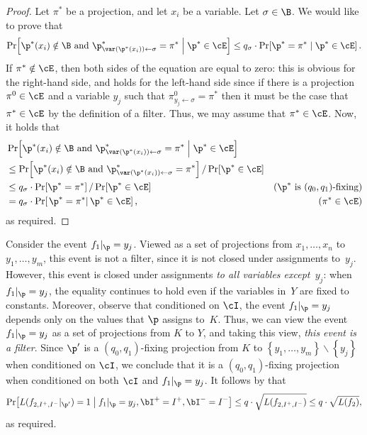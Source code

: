 \begin{proof}
Let $\pi^{*}$ be a projection, and let $x_{i}$ be a variable. Let
$\sigma\in\B$. We would like to prove that 
\[
\Pr\!\left[\p^{*}(x_{i})\notin\B\text{ and }\p_{\var(\p^{*}(x_{i}))\gets\sigma}^{*}=\pi^{*}\;\middle|\;\p^{*}\in\cE\right]\le q_{\sigma}\cdot\Pr\!\left[\p^{*}=\pi^{*}\mid\p^{*}\in\cE\right].
\]
If $\pi^{*}\notin\cE$, then both sides of the equation are equal
to zero: this is obvious for the right-hand side, and holds for the
left-hand side since if there is a projection~$\pi^{0}\in\cE$ and
a variable $y_{j}$ such that $\pi_{y_{j}\gets\sigma}^{0}=\pi^{*}$
then it must be the case that $\pi^{*}\in\cE$ by the definition of
a filter. Thus, we may assume that $\pi^{*}\in\cE$. Now, it holds
that 
\begin{align*}
 & \Pr\!\left[\p^{*}(x_{i})\notin\B\text{ and }\p_{\var(\p^{*}(x_{i}))\gets\sigma}^{*}=\pi^{*}\;\middle|\;\p^{*}\in\cE\right]\\
 & \le\Pr\!\left[\p^{*}(x_{i})\notin\B\text{ and }\p_{\var(\p^{*}(x_{i}))\gets\sigma}^{*}=\pi^{*}\right]/\Pr\!\left[\p^{*}\in\cE\right]\\
 & \le q_{\sigma}\cdot\Pr\!\left[\p^{*}=\pi^{*}\right]/\Pr\!\left[\p^{*}\in\cE\right] & \text{(\ensuremath{\p^{*}} is \ensuremath{(q_{0},q_{1})}-fixing)}\\
 & =q_{\sigma}\cdot\Pr\!\left[\left.\p^{*}=\pi^{*}\right|\p^{*}\in\cE\right], & \text{(\ensuremath{\pi^{*}\in\cE})}
\end{align*}
as required. 
\end{proof}
Consider the event $f_{1}|_{\p}=y_{j}$. Viewed as a set of projections
from $x_{1},\ldots,x_{n}$ to $y_{1},\ldots,y_{m}$, this event is
not a filter, since it is not closed under assignments to~$y_{j}$.
However, this event is closed under assignments \emph{to all variables
except~$y_{j}$}: when $f_{1}|_{\p}=y_{j}$, the equality continues
to hold even if the variables in~$Y$ are fixed to constants. Moreover,
observe that conditioned on $\cI$, the event $f_{1}|_{\p}=y_{j}$
depends only on the values that $\p$ assigns to~$K$. Thus, we can
view the event $f_{1}|_{\p}=y_{j}$ as a set of projections from $K$
to $Y$, and taking this view, \emph{this event is a filter}. Since
$\p'$ is a $(q_{0},q_{1})$-fixing projection from $K$ to $\left\{ y_{1},\ldots,y_{m}\right\} \backslash\left\{ y_{j}\right\} $
when conditioned on $\cI$, we conclude that it is a $(q_{0},q_{1})$-fixing
projection when conditioned on both $\cI$ and $f_{1}|_{\p}=y_{j}$.
It follows by  that 
\[
\Pr\!\left[L(f_{2,I^{+},I^{-}}|_{\p'})=1\;\middle|\;f_{1}|_{\p}=y_{j},\bI^{+}=I^{+},\bI^{-}=I^{-}\right]\le q\cdot\sqrt{L(f_{2,I^{+},I^{-}})}\le q\cdot\sqrt{L(f_{2})},
\]
as required.

